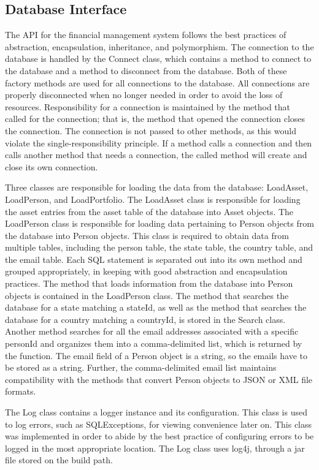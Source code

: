 \documentclass[12pt]{scrartcl} %
\begin{document}
    \subsection{Database Interface}

    The API for the financial management system follows the best practices of abstraction, encapsulation, inheritance, and polymorphism.  The connection to the database is handled by the Connect class, which contains a method to connect to the database and a method to disconnect from the database.  Both of these factory methods are used for all connections to the database.  All connections are properly disconnected when no longer needed in order to avoid the loss of resources.  Responsibility for a connection is maintained by the method that called for the connection; that is, the method that opened the connection closes the connection.  The connection is not passed to other methods, as this would violate the single-responsibility principle.  If a method calls a connection and then calls another method that needs a connection, the called method will create and close its own connection.

    Three classes are responsible for loading the data from the database:  LoadAsset, LoadPerson, and LoadPortfolio.  The LoadAsset class is responsible for loading the asset entries from the asset table of the database into Asset objects.  The LoadPerson class is responsible for loading data pertaining to Person objects from the database into Person objects.  This class is required to obtain data from multiple tables, including the person table, the state table, the country table, and the email table.  Each SQL statement is separated out into its own method and grouped appropriately, in keeping with good abstraction and encapsulation practices.  The method that loads information from the database into Person objects is contained in the LoadPerson class.  The method that searches the database for a state matching a stateId, as well as the method that searches the database for a country matching a countryId, is stored in the Search class.  Another method searches for all the email addresses associated with a specific personId and organizes them into a comma-delimited list, which is returned by the function.  The email field of a Person object is a string, so the emails have to be stored as a string.  Further, the comma-delimited email list maintains compatibility with the methods that convert Person objects to JSON or XML file formats.

    The Log class contains a logger instance and its configuration.  This class is used to log errors, such as SQLExceptions, for viewing convenience later on.  This class was implemented in order to abide by the best practice of configuring errors to be logged in the most appropriate location.  The Log class uses log4j, through a jar file stored on the build path.
\end{document}
